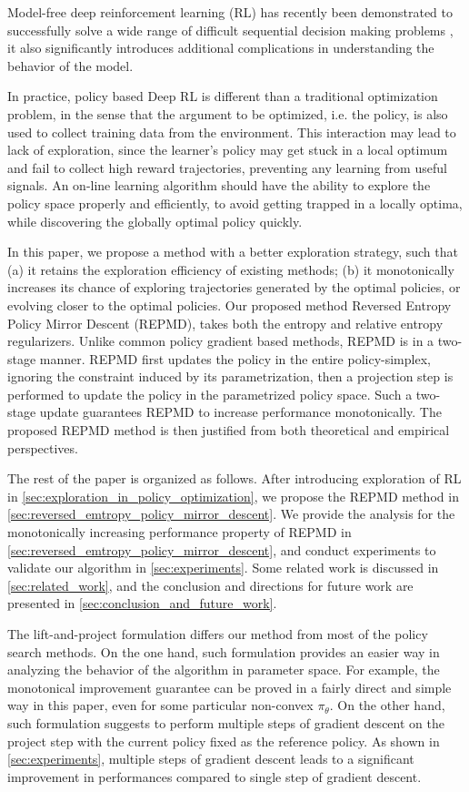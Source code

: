 Model-free deep reinforcement learning (RL) has recently been demonstrated to successfully solve a wide range of difficult sequential decision making problems \citep{schulman2015trust,mnih2015human,silver2016mastering}, it also significantly introduces additional complications in understanding the behavior of the model. 

In practice, policy based Deep RL is different than a traditional optimization problem, in the sense that the argument to be optimized, i.e. the policy, is also used to collect training data from the environment. This interaction may lead to lack of exploration, since the learner's policy may get stuck in a local optimum and fail to collect high reward trajectories, preventing any learning from useful signals.  An on-line learning algorithm should have the ability to explore the policy space properly and efficiently, to avoid getting trapped in a locally optima, while discovering the globally optimal policy quickly.

In this paper, we propose a method with a better exploration strategy, such that (a) it retains the exploration efficiency of existing methods; (b) it monotonically increases its chance of exploring trajectories generated by the optimal policies, or evolving closer to the optimal policies. Our proposed method Reversed Entropy Policy Mirror Descent (REPMD), takes both the entropy and relative entropy regularizers. Unlike common policy gradient based methods, REPMD is in a two-stage manner.  REPMD first updates the policy in the entire policy-simplex, ignoring the constraint induced by its parametrization, then a projection step is performed to update the policy in the parametrized policy space. Such a two-stage update guarantees REPMD to increase performance monotonically. The proposed REPMD method is then justified from both theoretical and empirical perspectives.

The rest of the paper is organized as follows. After introducing exploration of RL in \cref{sec:exploration_in_policy_optimization}, we propose the REPMD method in \cref{sec:reversed_emtropy_policy_mirror_descent}. We provide the analysis for the monotonically increasing performance property of REPMD in \cref{sec:reversed_emtropy_policy_mirror_descent}, and conduct experiments to validate our algorithm in \cref{sec:experiments}. Some related work is discussed in \cref{sec:related_work}, and the conclusion and directions for future work are presented in \cref{sec:conclusion_and_future_work}.

The lift-and-project formulation differs our method from most of the policy search methods. 
On the one hand, such formulation provides an easier way in analyzing the behavior of the algorithm in parameter space. For example, the monotonical improvement guarantee can be proved in a fairly direct and simple way in this paper, even for some particular non-convex $\pi_\theta$. 
On the other hand, such formulation suggests to perform multiple steps of gradient descent on the project step with the current policy fixed as the reference policy. As shown in \cref{sec:experiments}, multiple steps of gradient descent leads to a significant improvement in performances compared to single step of gradient descent.



